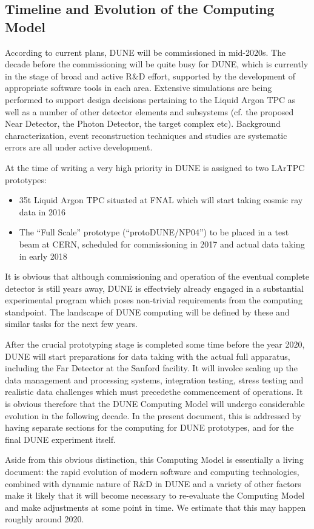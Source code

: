 \subsection{Timeline and Evolution of the Computing Model}
According to current plans, DUNE will be commissioned in mid-2020s. The decade before the commissioning will be quite busy
for DUNE, which is currently in the stage of broad and active R\&D effort, supported by the development of appropriate 
software tools in each area. Extensive simulations are being performed to support design decisions pertaining to the Liquid 
Argon TPC as well as a number of other detector elements and subsystems (cf. the proposed Near Detector, the Photon Detector, 
the target complex etc). Background characterization, event reconstruction techniques and studies are systematic errors are all under active development.

At the time of writing a very high priority in DUNE is assigned to two LArTPC prototypes:
\begin{itemize}
\item 35t Liquid Argon TPC situated at FNAL which will start taking cosmic ray data in 2016
\item The ``Full Scale'' prototype (``protoDUNE/NP04'') to be placed in a test beam at CERN, scheduled for commissioning in 2017 and actual data taking in early 2018
\end{itemize}
\noindent
It is obvious that although commissioning and operation of the eventual complete detector is still years away, DUNE is effectviely
already engaged in a substantial experimental program which poses non-trivial requirements from the computing standpoint. The
landscape of DUNE computing will be defined by these and similar tasks for the next few years.

After the crucial prototyping stage is completed some time before the year 2020, DUNE will start preparations for data taking with the
actual full apparatus, including the Far Detector at the Sanford facility. It will involce scaling up the data management and processing systems,
integration testing,  stress testing and  realistic data challenges which must precedethe commencement of operations.
It is obvious therefore that the DUNE Computing Model will undergo considerable evolution in the following decade. In the present document,
this is addressed  by having separate sections for the computing for DUNE prototypes, and for the final DUNE experiment itself.

Aside from this obvious distinction, this Computing Model is essentially a living document: 
the rapid evolution of modern software and computing technologies, combined with dynamic nature of R\&D in DUNE
and a variety of other factors make it likely that it will become necessary to re-evaluate the Computing Model and make adjustments at
some point in time. We estimate that this may happen roughly around 2020.

